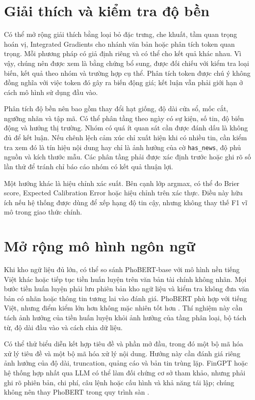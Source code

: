 \section{Giải thích và kiểm tra độ bền}

Có thể mở rộng giải thích bằng loại bỏ đặc trưng, che khuất, tầm quan trọng hoán vị,
Integrated Gradients cho nhánh văn bản hoặc phân tích token quan trọng. Mỗi phương pháp
có giả định riêng và có thể cho kết quả khác nhau. Vì vậy, chúng nên được xem là bằng
chứng bổ sung, được đối chiếu với kiểm tra loại biến, kết quả theo nhóm và trường hợp
cụ thể. Phân tích token được chú ý không đồng nghĩa với việc token đó gây ra biến động
giá; kết luận vẫn phải giới hạn ở cách mô hình sử dụng đầu vào.

Phân tích độ bền nên bao gồm thay đổi hạt giống, độ dài cửa sổ, mốc cắt, ngưỡng nhãn và tập
mã. Có thể phân tầng theo ngày có sự kiện, số tin, độ biến động và hướng thị trường.
Nhóm có quá ít quan sát cần được đánh dấu là không đủ để kết luận. Nếu chênh lệch
cảm xúc chỉ xuất hiện khi có nhiều tin, cần kiểm tra xem đó là tín hiệu nội dung hay
chỉ là ảnh hưởng của cờ \texttt{has\_news}, độ phủ nguồn và kích thước mẫu. Các phân
tầng phải được xác định trước hoặc ghi rõ số lần thử để tránh chỉ báo cáo nhóm có kết
quả thuận lợi.

Một hướng khác là hiệu chỉnh xác suất. Bên cạnh lớp argmax, có thể đo Brier score,
Expected Calibration Error hoặc hiệu chỉnh trên xác thực. Điều này hữu ích nếu hệ
thống được dùng để xếp hạng độ tin cậy, nhưng không thay thế F1 vĩ mô trong giao thức
chính.

\section{Mở rộng mô hình ngôn ngữ}

Khi kho ngữ liệu đủ lớn, có thể so sánh PhoBERT-base với mô hình nền tiếng Việt khác hoặc tiếp
tục tiền huấn luyện trên văn bản tài chính không nhãn. Mọi bước tiền huấn luyện phải lưu phiên bản
kho ngữ liệu và kiểm tra không đưa văn bản có nhãn hoặc thông tin tương lai vào đánh giá.
PhoBERT phù hợp với tiếng Việt, nhưng điểm kiểm lớn hơn không mặc nhiên tốt hơn
\cite{Nguyen2020_200300744v3}. Thí nghiệm này cần tách ảnh hưởng của tiền huấn luyện khỏi
ảnh hưởng của tầng phân loại, bộ tách từ, độ dài đầu vào và cách chia dữ liệu.

Có thể thử biểu diễn kết hợp tiêu đề và phần mở đầu, trong đó một bộ mã hóa xử lý tiêu
đề và một bộ mã hóa xử lý nội dung. Hướng này cần đánh giá riêng ảnh hưởng của độ dài,
truncation, quảng cáo và bản tin trùng lặp. FinGPT hoặc hệ thống hợp nhất qua LLM có
thể làm đối chứng cơ sở tham khảo, nhưng phải ghi rõ phiên bản, chi phí, câu lệnh hoặc cấu hình
và khả năng tái lập; chúng không nên thay PhoBERT trong quy trình sàn
\cite{Liang2024_241210823v2,Siala2026_260200086v3}.

